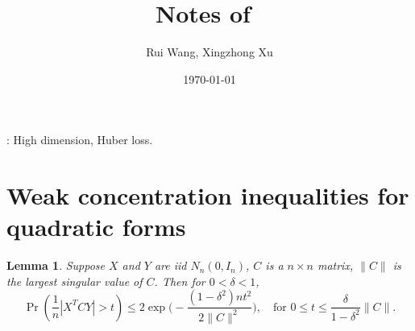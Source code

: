 \documentclass[11pt]{article}
\theoremstyle{plain}
\newtheorem{lemma}{\quad\quad Lemma}
\theoremstyle{definition}
\theoremstyle{remark}
\begin{document}
\title{Notes of~\cite{paul2007asymptotics}}
\author{Rui Wang, Xingzhong Xu \vspace{0.1in}\\}
\date{\today}
\maketitle

\begin{abstract}
\end{abstract}

\/: High dimension, Huber loss.


\section{Weak concentration inequalities for quadratic forms}
\begin{lemma}
    Suppose $X$ and $Y$ are iid $N_n(0,I_n)$, $C$ is a $n\times n$ matrix, $\|C\|$ is the largest singular value of $C$. Then for $0<\delta<1$,
    $$
    \Pr(\frac{1}{n}|X^T C Y|>t) \leq 2 \exp\Big(-\frac{(1-\delta^2)nt^2}{2\|C\|^2}\Big),\quad \text{for $0\leq t\leq \frac{\delta}{1-\delta^2}\|C\|$}.
    $$
\end{lemma}
\end{document}
